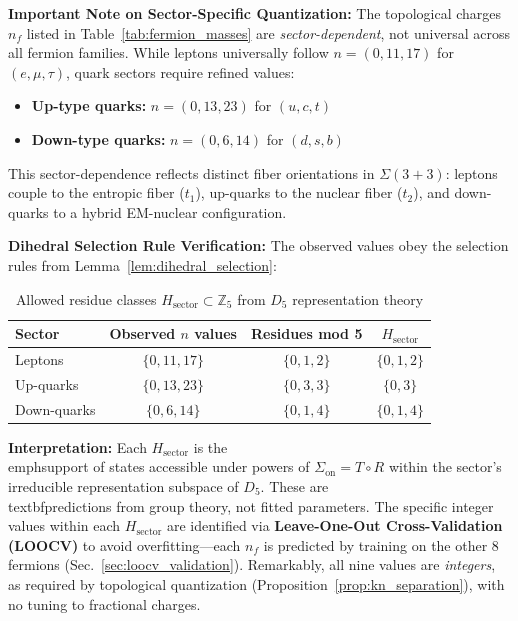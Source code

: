\documentclass[12pt]{article}
\begin{document}
\textbf{Important Note on Sector-Specific Quantization:} The topological charges $n_f$ listed in Table~\ref{tab:fermion_masses} are \textit{sector-dependent}, not universal across all fermion families. While leptons universally follow $n = (0, 11, 17)$ for $(e, \mu, \tau)$, quark sectors require refined values:
\begin{itemize}
\item \textbf{Up-type quarks:} $n = (0, 13, 23)$ for $(u, c, t)$
\item \textbf{Down-type quarks:} $n = (0, 6, 14)$ for $(d, s, b)$
\end{itemize}

This sector-dependence reflects distinct fiber orientations in $\Sigma(3+3)$: leptons couple to the entropic fiber ($t_1$), up-quarks to the nuclear fiber ($t_2$), and down-quarks to a hybrid EM-nuclear configuration. 

\textbf{Dihedral Selection Rule Verification:} The observed values obey the selection rules from Lemma~\ref{lem:dihedral_selection}:

\begin{table}[H]
\centering
\caption{Allowed residue classes $H_{\text{sector}} \subset \mathbb{Z}_5$ from $D_5$ representation theory}
\small
\begin{tabular}{lccc}
\toprule
\textbf{Sector} & \textbf{Observed $n$ values} & \textbf{Residues mod 5} & \textbf{$H_{\text{sector}}$} \\
\midrule
Leptons & $\{0, 11, 17\}$ & $\{0, 1, 2\}$ & $\{0, 1, 2\}$ \\
Up-quarks & $\{0, 13, 23\}$ & $\{0, 3, 3\}$ & $\{0, 3\}$ \\
Down-quarks & $\{0, 6, 14\}$ & $\{0, 1, 4\}$ & $\{0, 1, 4\}$ \\
\bottomrule
\end{tabular}
\label{tab:dihedral_selection}
\end{table}

\textbf{Interpretation:} Each $H_{\text{sector}}$ is the \\emph{support} of states accessible under powers of $\Sigma_{\text{on}} = T \circ R$ within the sector's irreducible representation subspace of $D_5$. These are \\textbf{predictions from group theory}, not fitted parameters. The specific integer values within each $H_{\text{sector}}$ are identified via \textbf{Leave-One-Out Cross-Validation (LOOCV)} to avoid overfitting—each $n_f$ is predicted by training on the other 8 fermions (Sec.~\ref{sec:loocv_validation}). Remarkably, all nine values are \textit{integers}, as required by topological quantization (Proposition~\ref{prop:kn_separation}), with no tuning to fractional charges.
\end{document}
